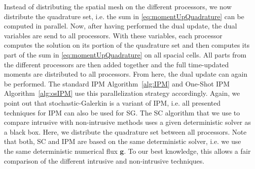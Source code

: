 Instead of distributing the spatial mesh on the different processors, we now distribute the quadrature set, i.e. the sum in \eqref{eq:momentUpQuadrature} can be computed in parallel. Now, after having performed the dual update, the dual variables are send to all processors. With these variables, each processor computes the solution on its portion of the quadrature set and then computes its part of the sum in \eqref{eq:momentUpQuadrature} on all spacial cells. All parts from the different processors are then added together and the full time-updated moments are distributed to all processors. From here, the dual update can again be performed. The standard IPM Algorithm~\ref{alg:IPM} and One-Shot IPM Algorithm~\ref{alg:osIPM} use this parallelization strategy accordingly. Again, we point out that stochastic-Galerkin is a variant of IPM, i.e. all presented techniques for IPM can also be used for SG. The SC algorithm that we use to compare intrusive with non-intrusive methods uses a given deterministic solver as a black box. Here, we distribute the quadrature set between all processors. Note that both, SC and IPM are based on the same deterministic solver, i.e. we use the same deterministic numerical flux $\bm g$. To our best knowledge, this allows a fair comparison of the different intrusive and non-intrusive techniques.
